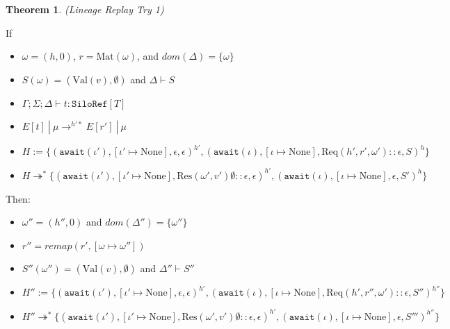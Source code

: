 \documentclass{article}
\theoremstyle{definition}
\newtheorem{thm}{Theorem}[section]
\newcommand{\Req}[3]{\text{Req}(#1, #2, #3)}
\newcommand{\Res}[2]{\text{Res}(#1, #2)}
\newcommand{\Val}[1]{\text{Val}(#1)}
\begin{document}
\begin{thm}
\emph{(Lineage Replay Try 1)}\label{thm:replay-try1}

If
\begin{itemize}
\item $\omega = (h, 0)$, $r = \text{Mat}(\omega)$, and $dom(\Delta) = \{ \omega \}$
\item $S(\omega) = ({\Val v}, \emptyset)$ and $\Delta \vdash S$
\item $\Gamma; \Sigma ; \Delta \vdash t : \texttt{SiloRef}[T]$
\item $E[t] ~|~ \mu \rightarrow^{h'*} E[r'] ~|~ \mu$
\item $H := \{ (\texttt{await}(\iota'), [\iota' \mapsto \text{None}], \epsilon, \epsilon)^{h'}, (\texttt{await}(\iota), [\iota \mapsto \text{None}], {\Req {h'} {r'} {\omega'}} :: \epsilon, S)^h\}$
\item $H \twoheadrightarrow^* \{ (\texttt{await}(\iota'), [\iota' \mapsto \text{None}], {\Res {\omega'} {v'} \emptyset} :: \epsilon, \epsilon)^{h'}, (\texttt{await}(\iota), [\iota \mapsto \text{None}], \epsilon, S')^h\}$
\end{itemize}
Then:
\begin{itemize}
\item $\omega'' = (h'', 0)$ and $dom(\Delta'') = \{ \omega'' \}$
\item $r'' = remap(r', [\omega \mapsto \omega''])$
\item $S''(\omega'') = ({\Val v}, \emptyset)$ and $\Delta'' \vdash S''$
\item $H'' := \{ (\texttt{await}(\iota'), [\iota' \mapsto \text{None}], \epsilon, \epsilon)^{h'}, (\texttt{await}(\iota), [\iota \mapsto \text{None}], {\Req {h'} {r''} {\omega'}} :: \epsilon, S'')^{h''}\}$
\item $H'' \twoheadrightarrow^* \{ (\texttt{await}(\iota'), [\iota' \mapsto \text{None}], {\Res {\omega'} {v'} \emptyset} :: \epsilon, \epsilon)^{h'}, (\texttt{await}(\iota), [\iota \mapsto \text{None}], \epsilon, S''')^{h''}\}$

\end{itemize}
\end{thm}
\end{document}
